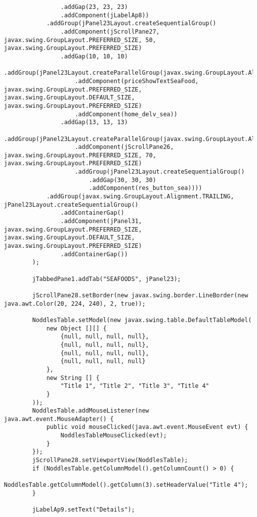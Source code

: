 \documentclass[12pt,a4paper]{article}
\begin{document}
\begin{lstlisting}
                .addGap(23, 23, 23)
                .addComponent(jLabelAp8))
            .addGroup(jPanel23Layout.createSequentialGroup()
                .addComponent(jScrollPane27, javax.swing.GroupLayout.PREFERRED_SIZE, 50, javax.swing.GroupLayout.PREFERRED_SIZE)
                .addGap(10, 10, 10)
                .addGroup(jPanel23Layout.createParallelGroup(javax.swing.GroupLayout.Alignment.LEADING)
                    .addComponent(priceShowTextSeaFood, javax.swing.GroupLayout.PREFERRED_SIZE, javax.swing.GroupLayout.DEFAULT_SIZE, javax.swing.GroupLayout.PREFERRED_SIZE)
                    .addComponent(home_delv_sea))
                .addGap(13, 13, 13)
                .addGroup(jPanel23Layout.createParallelGroup(javax.swing.GroupLayout.Alignment.LEADING)
                    .addComponent(jScrollPane26, javax.swing.GroupLayout.PREFERRED_SIZE, 70, javax.swing.GroupLayout.PREFERRED_SIZE)
                    .addGroup(jPanel23Layout.createSequentialGroup()
                        .addGap(30, 30, 30)
                        .addComponent(res_button_sea))))
            .addGroup(javax.swing.GroupLayout.Alignment.TRAILING, jPanel23Layout.createSequentialGroup()
                .addContainerGap()
                .addComponent(jPanel31, javax.swing.GroupLayout.PREFERRED_SIZE, javax.swing.GroupLayout.DEFAULT_SIZE, javax.swing.GroupLayout.PREFERRED_SIZE)
                .addContainerGap())
        );

        jTabbedPane1.addTab("SEAFOODS", jPanel23);

        jScrollPane28.setBorder(new javax.swing.border.LineBorder(new java.awt.Color(20, 224, 240), 2, true));

        NoddlesTable.setModel(new javax.swing.table.DefaultTableModel(
            new Object [][] {
                {null, null, null, null},
                {null, null, null, null},
                {null, null, null, null},
                {null, null, null, null}
            },
            new String [] {
                "Title 1", "Title 2", "Title 3", "Title 4"
            }
        ));
        NoddlesTable.addMouseListener(new java.awt.event.MouseAdapter() {
            public void mouseClicked(java.awt.event.MouseEvent evt) {
                NoddlesTableMouseClicked(evt);
            }
        });
        jScrollPane28.setViewportView(NoddlesTable);
        if (NoddlesTable.getColumnModel().getColumnCount() > 0) {
            NoddlesTable.getColumnModel().getColumn(3).setHeaderValue("Title 4");
        }

        jLabelAp9.setText("Details");


\end{lstlisting}
\end{document}
